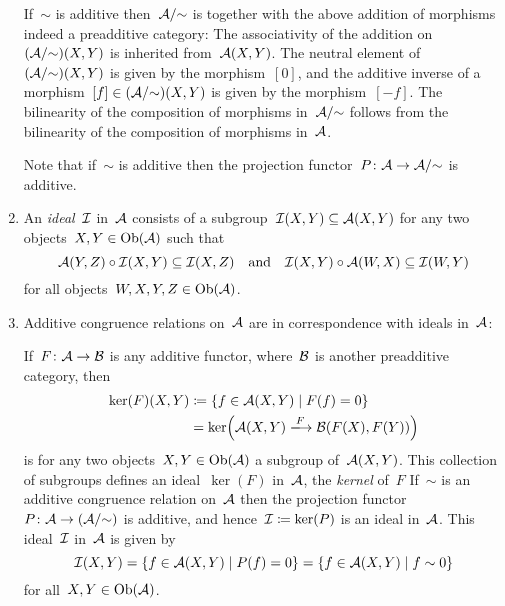 \begin{remark*}
\begin{enumerate}
      If~$\sim$ is additive then~$\mathcal{A}/{\sim}$ is together with the above addition of morphisms indeed a preadditive category:
      The associativity of the addition on~$(\mathcal{A}/{\sim})(X,Y)$ is inherited from~$\mathcal{A}(X,Y)$.
      The neutral element of~$(\mathcal{A}/{\sim})(X,Y)$ is given by the morphism~$[0]$, and the additive inverse of a morphism~$[f] \in (\mathcal{A}/{\sim})(X,Y)$ is given by the morphism~$[-f]$.
      The bilinearity of the composition of morphisms in~$\mathcal{A}/{\sim}$ follows from the bilinearity of the composition of morphisms in~$\mathcal{A}$.
      
      Note that if~$\sim$ is additive then the projection functor~$P \colon \mathcal{A} \to \mathcal{A}/{\sim}$ is additive.
    \item
      An \emph{ideal}~$\mathcal{I}$ in~$\mathcal{A}$ consists of a subgroup~$\mathcal{I}(X,Y) \subseteq \mathcal{A}(X,Y)$ for any two objects~$X, Y \in \operatorname{Ob}(\mathcal{A})$ such that
      \[
                  \mathcal{A}(Y,Z) \circ \mathcal{I}(X,Y)
        \subseteq \mathcal{I}(X,Z)
        \quad\text{and}\quad
                  \mathcal{I}(X,Y) \circ \mathcal{A}(W,X)
        \subseteq \mathcal{I}(W,Y)
      \]
      for all objects~$W, X, Y, Z \in \operatorname{Ob}(\mathcal{A})$.
    \item
      Additive congruence relations on~$\mathcal{A}$ are in {\onetoone} correspondence with ideals in~$\mathcal{A}$:
      
      If~$F \colon \mathcal{A} \to \mathcal{B}$ is any additive functor, where~$\mathcal{B}$ is another preadditive category, then
      \begin{align*}
                  \ker(F)(X,Y)
        &\defined \{
                    f \in \Acat(X,Y)
                  \suchthat
                    F(f) = 0
                  \}  \\
        &=        \ker\Bigl( \Acat(X,Y) \xlongto{F} \Bcat(F(X),F(Y)) \Bigr)
      \end{align*}
      is for any two objects~$X, Y \in \operatorname{Ob}(\mathcal{A})$ a subgroup of~$\mathcal{A}(X,Y)$.
      This collection of subgroups defines an ideal~$\ker(F)$ in~$\mathcal{A}$, the \emph{kernel} of~$F$
      If~$\sim$ is an additive congruence relation on~$\mathcal{A}$ then the projection functor~$P \colon \mathcal{A} \to (\mathcal{A}/{\sim})$ is additive, and hence~$\mathcal{I} \coloneqq \ker(P)$ is an ideal in~$\mathcal{A}$.
      This ideal~$\mathcal{I}$ in~$\mathcal{A}$ is given by
      \[
          \Ideal(X,Y)
        = \{
              f \in \Acat(X,Y)
            \suchthat
              P(f) = 0
            \}
        =   \{
              f \in \Acat(X,Y)
            \suchthat
              f \sim 0
            \}
      \]
      for all~$X, Y \in \operatorname{Ob}(\mathcal{A})$.
      

\end{enumerate}
\end{remark*}
